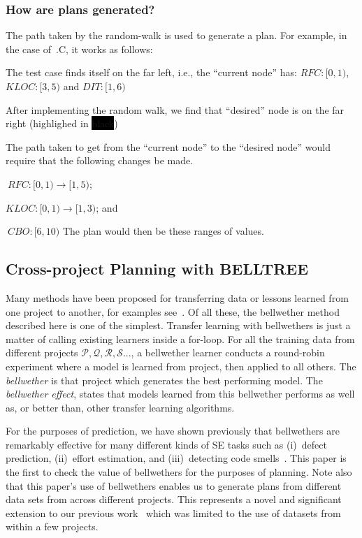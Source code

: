 {\color{steel}
\subsubsection*{ How are plans generated?}

The path taken by the random-walk is used to generate a plan. For example, in the case of~.C, it works as follows:
\be
\item The test case finds itself on the far left, i.e., the ``current node'' has: $RFC: [0, 1)$, $KLOC: [3,5)$ and $DIT: [1,6)$
\item After implementing the random walk, we find that ``desired'' node is on the far right (highlighed in \colorbox{black}{{\color{white} black}})
\item The path taken to get from the ``current node'' to the ``desired node'' would require that the following changes be made.
\bi
\item[$\circ$] $~RFC:  [0, 1) \longrightarrow [1, 5)$;
\item[$\circ$] $KLOC:  [0, 1) \longrightarrow [1, 3)$; and
\item[$\circ$] $~CBO:  [6, 10)$
\ei
The plan would then be these ranges of values.
\ee
}


\subsection{Cross-project Planning with BELLTREE}
\label{sect:CPXTREE}

Many methods have been proposed for transferring data or lessons
learned from one project to another, for examples see~\citep{Nam2013, Nam2015, jing15, kocaguneli2011find, kocaguneli2012, turhan09, peters15}. Of all these, the bellwether method described here is one of the simplest.
Transfer learning with bellwethers is just a matter of calling existing
learners inside a for-loop. For all the training data from different projects $\mathcal{P, Q, R, S...}$, 
a bellwether learner conducts a round-robin experiment where a model is learned from project, then applied to all others. The {\em bellwether} is that project which generates the best performing model. The {\em bellwether effect}, states that models
learned from this bellwether performs as well as, or better than, other transfer learning algorithms. 

For the purposes of prediction, we have shown previously that bellwethers are remarkably
effective for many different kinds of SE tasks such as (i)~defect prediction, (ii)~effort
estimation, and (iii)~detecting code smells~\citep{krishna17b}. This paper is the first to check the value of bellwethers for the purposes of planning. Note also that this paper's use of bellwethers enables us to generate plans from different data sets from across different projects. This represents a novel and significant extension to our previous work~\citep{krishna17a} which was limited to the use of datasets from within a few projects.



